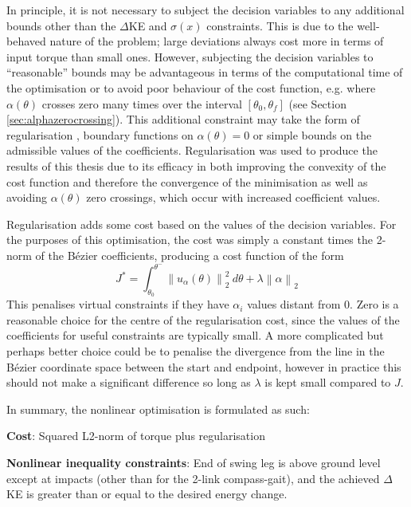 In principle, it is not necessary to subject the decision variables to any additional bounds other than the $\Delta$KE and $\sigma(x)$ constraints. This is due to the well-behaved nature of the problem; large deviations always cost more in terms of input torque than small ones. However, subjecting the decision variables to ``reasonable'' bounds may be advantageous in terms of the computational time of the optimisation or to avoid poor behaviour of the cost function, e.g. where $\alpha(\theta)$ crosses zero many times over the interval $[\theta_0, \theta_f]$ (see Section \ref{sec:alphazerocrossing}). This additional constraint may take the form of regularisation \cite{seidman1989well}, boundary functions on $\alpha(\theta) = 0$ or simple bounds on the admissible values of the coefficients. Regularisation was used to produce the results of this thesis due to its efficacy in both improving the convexity of the cost function and therefore the convergence of the minimisation as well as avoiding $\alpha(\theta)$ zero crossings, which occur with increased coefficient values. 

Regularisation adds some cost based on the values of the decision variables. For the purposes of this optimisation, the cost was simply a constant times the 2-norm of the Bézier coefficients, producing a cost function of the form
\begin{equation} \label{eqn:regcost}
J^* = \int_{\theta_0}^{\theta^-}\left\lVert u_\alpha(\theta) \right\rVert_2^2 ~ d\theta
+ \lambda\left\lVert \alpha \right\rVert_2
\end{equation}
This penalises virtual constraints if they have $\alpha_i$ values distant from 0. Zero is a reasonable choice for the centre of the regularisation cost, since the values of the coefficients for useful constraints are typically small. A more complicated but perhaps better choice could be to penalise the divergence from the line in the Bézier coordinate space between the start and endpoint, however in practice this should not make a significant difference so long as $\lambda$ is kept small compared to $J$.

In summary, the nonlinear optimisation is formulated as such:

\textbf{Cost}: Squared L2-norm of torque plus regularisation

\textbf{Nonlinear inequality constraints}: End of swing leg is above ground level except at impacts (other than for the 2-link compass-gait), and the achieved $\Delta$KE is greater than or equal to the desired energy change.

